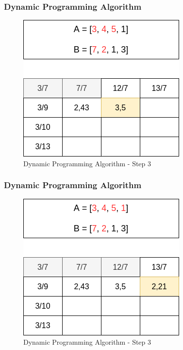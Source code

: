 \documentclass{beamer}
\begin{document}
    \begin{frame}
      \frametitle{Dynamic Programming Algorithm}
      
      \begin{figure}
		\centering
		\includegraphics[scale=.48]{dp_6.png}
		\caption{Dynamic Programming Algorithm - Step 3}
		\label{fig:dynamic_programming_algorithm_6}
	  \end{figure}
      
    \end{frame}
    
    \begin{frame}
      \frametitle{Dynamic Programming Algorithm}
      
      \begin{figure}
		\centering
		\includegraphics[scale=.48]{dp_7.png}
		\caption{Dynamic Programming Algorithm - Step 3}
		\label{fig:dynamic_programming_algorithm_7}
	  \end{figure}
      
    \end{frame}
    
\end{document}
